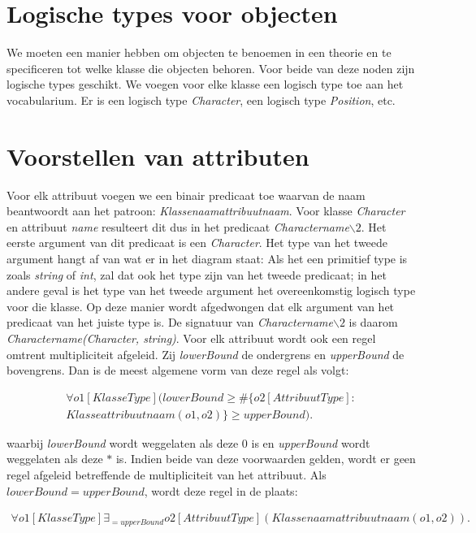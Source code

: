 \section{Logische types voor objecten}
We moeten een manier hebben om objecten te benoemen in een theorie en te specificeren tot welke klasse die objecten behoren. Voor beide van deze noden zijn logische types geschikt. We voegen voor elke klasse een logisch type toe aan het vocabularium. Er is een logisch type \textit{Character}, een logisch type \textit{Position}, etc.

\section{Voorstellen van attributen}
Voor elk attribuut voegen we een binair predicaat toe waarvan de naam beantwoordt aan het patroon: \textit{Klassenaamattribuutnaam}. Voor klasse \textit{Character} en attribuut \textit{name} resulteert dit dus in het predicaat \textit{Charactername$\backslash2$}. Het eerste argument van dit predicaat is een \textit{Character}. Het type van het tweede argument hangt af van wat er in het diagram staat: Als het een primitief type is zoals \textit{string} of \textit{int}, zal dat ook het type zijn van het tweede predicaat; in het andere geval is het type van het tweede argument het overeenkomstig logisch type voor die klasse. Op deze manier wordt afgedwongen dat elk argument van het predicaat van het juiste type is.
De signatuur van \textit{Charactername$\backslash2$} is daarom \textit{Charactername(Character, string)}.
Voor elk attribuut wordt ook een regel omtrent multipliciteit afgeleid. Zij \textit{lowerBound} de ondergrens en \textit{upperBound} de bovengrens. Dan is de meest algemene vorm van deze regel als volgt:
	
\begin{align*}
	\forall{o1}[KlasseType](lowerBound \geq \#\{o2 [AttribuutType] : \\ Klasseattribuutnaam(o1,o2)\} \geq upperBound).
\end{align*}
	
waarbij \textit{lowerBound} wordt weggelaten als deze $0$ is en \textit{upperBound} wordt weggelaten als deze $*$ is. Indien beide van deze voorwaarden gelden, wordt er geen regel afgeleid betreffende de multipliciteit van het attribuut. Als $lowerBound = upperBound$, wordt deze regel in de plaats:
	
\begin{align*}
	\forall{o1}[KlasseType] \exists_{=upperBound}{o2}[AttribuutType](Klassenaamattribuutnaam(o1,o2)).
\end{align*}
	
